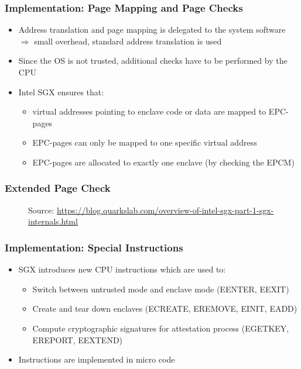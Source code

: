 \begin{frame}
    \frametitle{Implementation: Page Mapping and Page Checks}
    \begin{itemize}[<+->]
        \item Address translation and page mapping is delegated to the system software \newline
              $\Rightarrow$ small overhead, standard address translation is used
        \item Since the OS is not trusted, additional checks have to be performed by the CPU
        \item Intel SGX ensures that: 
            \begin{itemize}
                \item virtual addresses pointing to enclave code or data are mapped to EPC-pages
                \item EPC-pages can only be mapped to one specific virtual address
                \item EPC-pages are allocated to exactly one enclave (by checking the EPCM)
            \end{itemize}
    \end{itemize}
\end{frame}

\begin{frame}
    \frametitle{Extended Page Check}
    \begin{figure}
        \centering
        \caption*{Source: \url{https://blog.quarkslab.com/overview-of-intel-sgx-part-1-sgx-internals.html}}
    \end{figure}
\end{frame}

\begin{frame}
    \frametitle{Implementation: Special Instructions}
    \begin{itemize}[<+->]
        \item SGX introduces new CPU instructions which are used to:
        \begin{itemize}
            \item Switch between untrusted mode and enclave mode (EENTER, EEXIT)
            \item Create and tear down enclaves (ECREATE, EREMOVE, EINIT, EADD)
            \item Compute cryptographic signatures for attestation process (EGETKEY, EREPORT, EEXTEND)
        \end{itemize}
        \item Instructions are implemented in micro code
    \end{itemize}
\end{frame}

